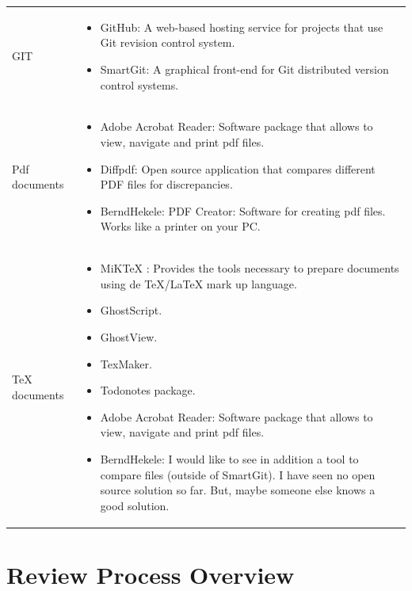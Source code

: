 \documentclass{template/openetcs_article}
\begin{document}
\begin{flushleft}

\begin{tabular}{|m{3cm}|m{11cm}|}
\hline
\rowcolor{myblue}
\multicolumn{2}{|c|}{Tools} \\\hline
GIT &
\begin{itemize}
\item GitHub: A web-based hosting service for projects that use Git revision control system.
\item SmartGit: A graphical front-end for Git distributed version control systems. 
\end{itemize}\\\hline
Pdf documents &
\begin{itemize}
\item Adobe Acrobat Reader: Software package that allows to view, navigate and print pdf files.
\item Diffpdf: Open source application that compares different PDF files for discrepancies. 
\item BerndHekele: PDF Creator: Software for creating pdf files. Works like a printer on your PC.

\end{itemize}\\\hline
TeX documents &
\begin{itemize}
\item MiKTeX : Provides the tools necessary to prepare documents using de TeX/LaTeX mark up language.
\item GhostScript. 
\item GhostView.
\item TexMaker.
\item Todonotes package.
\item Adobe Acrobat Reader: Software package that allows to view, navigate and print pdf files.
\item BerndHekele: I would like to see in addition a tool to compare files (outside of SmartGit). I have seen no open source solution so far. But, maybe someone else knows a good solution.

\end{itemize}\\\hline
\end{tabular}
\end{flushleft}

\section{Review Process Overview}
\end{document}
